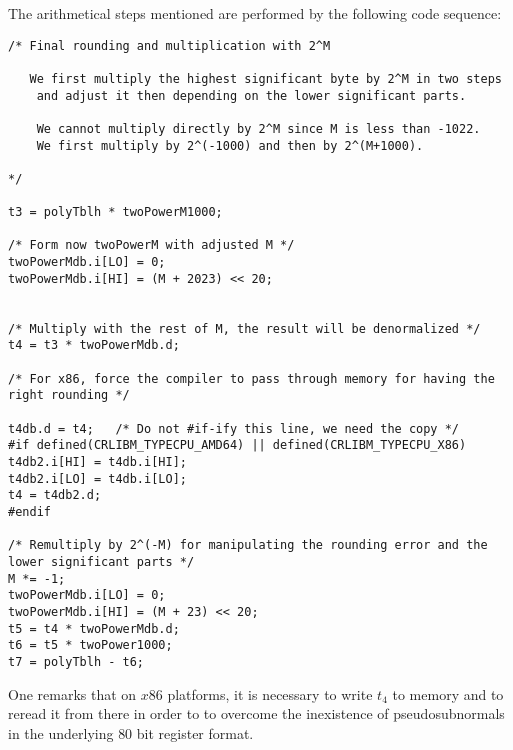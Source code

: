The arithmetical steps mentioned are performed by the following code sequence:
\begin{lstlisting}[caption={Underflowed final multiplication and rounding},firstnumber=1]
/* Final rounding and multiplication with 2^M 

   We first multiply the highest significant byte by 2^M in two steps
	and adjust it then depending on the lower significant parts.

	We cannot multiply directly by 2^M since M is less than -1022.
	We first multiply by 2^(-1000) and then by 2^(M+1000).

*/

t3 = polyTblh * twoPowerM1000;

/* Form now twoPowerM with adjusted M */
twoPowerMdb.i[LO] = 0;
twoPowerMdb.i[HI] = (M + 2023) << 20;


/* Multiply with the rest of M, the result will be denormalized */
t4 = t3 * twoPowerMdb.d;

/* For x86, force the compiler to pass through memory for having the right rounding */

t4db.d = t4;   /* Do not #if-ify this line, we need the copy */
#if defined(CRLIBM_TYPECPU_AMD64) || defined(CRLIBM_TYPECPU_X86) 
t4db2.i[HI] = t4db.i[HI];
t4db2.i[LO] = t4db.i[LO];
t4 = t4db2.d;
#endif

/* Remultiply by 2^(-M) for manipulating the rounding error and the lower significant parts */
M *= -1;
twoPowerMdb.i[LO] = 0;
twoPowerMdb.i[HI] = (M + 23) << 20;
t5 = t4 * twoPowerMdb.d;
t6 = t5 * twoPower1000;
t7 = polyTblh - t6;
\end{lstlisting}
One remarks that on $x86$ platforms, it is necessary to write $t_4$ to
memory and to reread it from there in order to to overcome the inexistence
of pseudosubnormals in the underlying $80$ bit register format.

